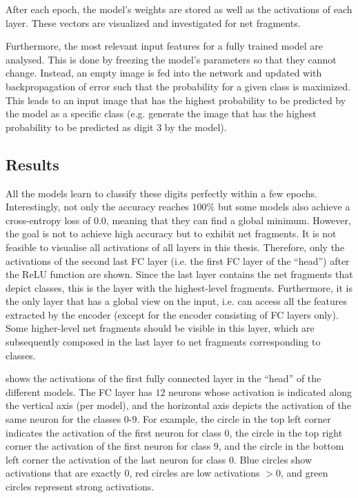 After each epoch, the model's weights are stored as well as the activations of each layer.
These vectors are visualized and investigated for net fragments.

Furthermore, the most relevant input features for a fully trained model are analysed.
This is done by freezing the model's parameters so that they cannot change.
Instead, an empty image is fed into the network and updated with backpropagation of error such that the probability for a given class is maximized.
This leads to an input image that has the highest probability to be predicted by the model as a specific class (e.g. generate the image that has the highest probability to be predicted as digit $3$ by the model).


\subsection{Results}

All the models learn to classify these digits perfectly within a few epochs.
Interestingly, not only the accuracy reaches $100\%$ but some models also achieve a cross-entropy loss of $0.0$, meaning that they can find a global minimum.
However, the goal is not to achieve high accuracy but to exhibit net fragments.
It is not feasible to visualise all activations of all layers in this thesis.
Therefore, only the activations of the second last FC layer (i.e. the first FC layer of the ``head'') after the ReLU function are shown.
Since the last layer contains the net fragments that depict classes, this is the layer with the highest-level fragments.
Furthermore, it is the only layer that has a global view on the input, i.e. can access all the features extracted by the encoder (except for the encoder consisting of FC layers only).
Some higher-level net fragments should be visible in this layer, which are subsequently composed in the last layer to net fragments corresponding to classes.

 shows the activations of the first fully connected layer in the ``head'' of the different models.
The FC layer has $12$ neurons whose activation is indicated along the vertical axis (per model), and the horizontal axis depicts the activation of the same neuron for the classes $0$-$9$.
For example, the circle in the top left corner indicates the activation of the first neuron for class $0$, the circle in the top right corner the activation of the first neuron for class $9$, and the circle in the bottom left corner the activation of the last neuron for class $0$.
Blue circles show activations that are exactly $0$, red circles are low activations $>0$, and green circles represent strong activations.

